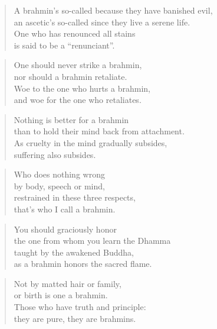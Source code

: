 \documentclass[12pt,openany]{book}%
\begin{document}
\begin{verse}%
A brahmin’s so-called because they have banished evil, \\
an ascetic’s so-called since they live a serene life. \\
One who has renounced all stains \\
is said to be a “renunciant”. 

%
\end{verse}

\begin{verse}%
One should never strike a brahmin, \\
nor should a brahmin retaliate. \\
Woe to the one who hurts a brahmin, \\
and woe for the one who retaliates. 

%
\end{verse}

\begin{verse}%
Nothing is better for a brahmin \\
than to hold their mind back from attachment. \\
As cruelty in the mind gradually subsides, \\
suffering also subsides. 

%
\end{verse}

\begin{verse}%
Who does nothing wrong \\
by body, speech or mind, \\
restrained in these three respects, \\
that’s who I call a brahmin. 

%
\end{verse}

\begin{verse}%
You should graciously honor \\
the one from whom you learn the Dhamma \\
taught by the awakened Buddha, \\
as a brahmin honors the sacred flame. 

%
\end{verse}

\begin{verse}%
Not by matted hair or family, \\
or birth is one a brahmin. \\
Those who have truth and principle: \\
they are pure, they are brahmins. 

%
\end{verse}
\end{document}

